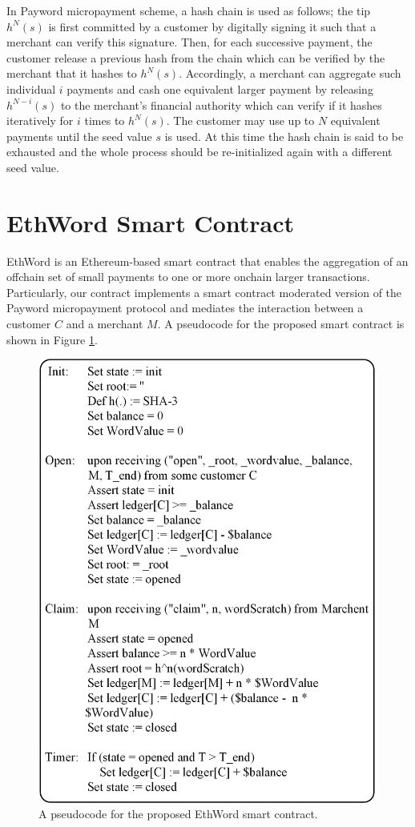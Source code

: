 \documentclass{llncs}
\newcommand{\ethword}{{\sf EthWord}{}}
\begin{document}
\noindent In Payword micropayment scheme, a hash chain is used as follows; the tip $h^N(s)$ is first committed by a customer by digitally signing it such that a merchant can verify this signature. Then, for each successive payment, the customer release a previous hash from the chain which can be verified by the merchant that it hashes to $h^N(s)$. Accordingly, a merchant can aggregate such individual $i$ payments and cash one equivalent larger payment by releasing $h^{N-i}(s)$ to the merchant's financial authority which can verify if it hashes iteratively for $i$ times to $h^N(s)$. The customer may use up to $N$ equivalent payments until the seed value $s$ is used. At this time the hash chain is said to be exhausted and the whole process should be re-initialized again with a different seed value. 
\section{\ethword{} Smart Contract}
\ethword{} is an Ethereum-based smart contract that enables the aggregation of an offchain set of small payments to one or more onchain larger transactions. Particularly, our contract implements a smart contract moderated version of the Payword micropayment protocol and mediates the interaction between a customer $C$ and a merchant $M$. A pseudocode for the proposed smart contract is shown in Figure \ref{fig.contract}. 
\begin{figure}[!th]
	\centering
	\includegraphics[scale=0.7]{pics/contract.png}
	\caption{A pseudocode for the proposed \ethword{} smart contract.}
	\label{fig.contract}
\end{figure} 
\end{document}
